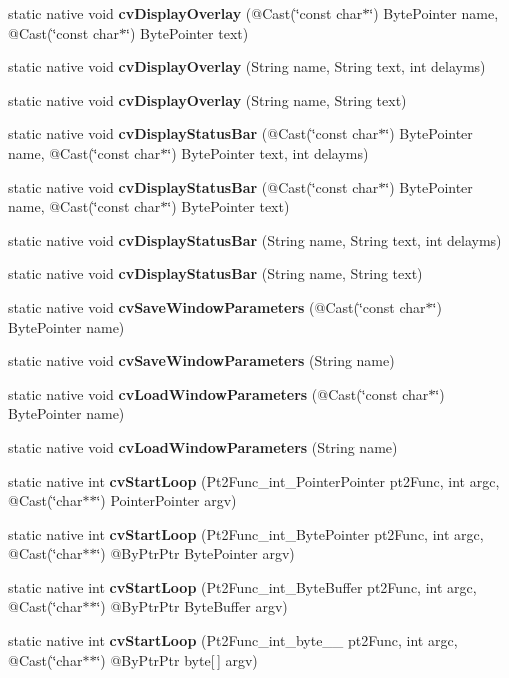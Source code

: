 \begin{DoxyCompactItemize}
\item 
static native void {\bfseries cv\+Display\+Overlay} (@Cast(\char`\"{}const char$\ast$\char`\"{}) Byte\+Pointer name, @Cast(\char`\"{}const char$\ast$\char`\"{}) Byte\+Pointer text)
\item 
static native void {\bfseries cv\+Display\+Overlay} (String name, String text, int delayms)
\item 
static native void {\bfseries cv\+Display\+Overlay} (String name, String text)
\item 
static native void {\bfseries cv\+Display\+Status\+Bar} (@Cast(\char`\"{}const char$\ast$\char`\"{}) Byte\+Pointer name, @Cast(\char`\"{}const char$\ast$\char`\"{}) Byte\+Pointer text, int delayms)
\item 
static native void {\bfseries cv\+Display\+Status\+Bar} (@Cast(\char`\"{}const char$\ast$\char`\"{}) Byte\+Pointer name, @Cast(\char`\"{}const char$\ast$\char`\"{}) Byte\+Pointer text)
\item 
static native void {\bfseries cv\+Display\+Status\+Bar} (String name, String text, int delayms)
\item 
static native void {\bfseries cv\+Display\+Status\+Bar} (String name, String text)
\item 
static native void {\bfseries cv\+Save\+Window\+Parameters} (@Cast(\char`\"{}const char$\ast$\char`\"{}) Byte\+Pointer name)
\item 
static native void {\bfseries cv\+Save\+Window\+Parameters} (String name)
\item 
static native void {\bfseries cv\+Load\+Window\+Parameters} (@Cast(\char`\"{}const char$\ast$\char`\"{}) Byte\+Pointer name)
\item 
static native void {\bfseries cv\+Load\+Window\+Parameters} (String name)
\item 
static native int {\bfseries cv\+Start\+Loop} (Pt2\+Func\+\_\+int\+\_\+\+Pointer\+Pointer pt2\+Func, int argc, @Cast(\char`\"{}char$\ast$$\ast$\char`\"{}) Pointer\+Pointer argv)
\item 
static native int {\bfseries cv\+Start\+Loop} (Pt2\+Func\+\_\+int\+\_\+\+Byte\+Pointer pt2\+Func, int argc, @Cast(\char`\"{}char$\ast$$\ast$\char`\"{}) @By\+Ptr\+Ptr Byte\+Pointer argv)
\item 
static native int {\bfseries cv\+Start\+Loop} (Pt2\+Func\+\_\+int\+\_\+\+Byte\+Buffer pt2\+Func, int argc, @Cast(\char`\"{}char$\ast$$\ast$\char`\"{}) @By\+Ptr\+Ptr Byte\+Buffer argv)
\item 
static native int {\bfseries cv\+Start\+Loop} (Pt2\+Func\+\_\+int\+\_\+byte\+\_\+\+\_\+ pt2\+Func, int argc, @Cast(\char`\"{}char$\ast$$\ast$\char`\"{}) @By\+Ptr\+Ptr byte\mbox{[}$\,$\mbox{]} argv)

\end{DoxyCompactItemize}
